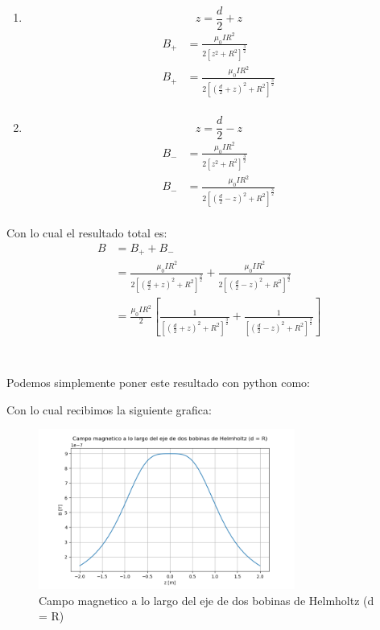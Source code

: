\documentclass{report}
\begin{document}
\begin{enumerate}
	\item $$z = \frac{d}{2} + z$$
		\begin{align*}
			B_+ &= \frac{\mu_0 I R^2}{2\left[ z^2 + R^2\right]^{\frac{3}{2}}}\\
			B_+ &= \frac{\mu_0 I R^2}{2\left[ \left(\frac{d}{2} + z\right)^2 + R^2\right]^{\frac{3}{2}}}\\
		\end{align*}
	\item $$z = \frac{d}{2} - z$$
		\begin{align*}
			B_- &= \frac{\mu_0 I R^2}{2\left[ z^2 + R^2\right]^{\frac{3}{2}}}\\
			B_- &= \frac{\mu_0 I R^2}{2\left[ \left(\frac{d}{2} - z\right)^2 + R^2\right]^{\frac{3}{2}}}\\
		\end{align*}
\end{enumerate}

Con lo cual el resultado total es:
\begin{align*}
	B &= B_+ + B_-\\
	& = \frac{\mu_0 I R^2}{2\left[ \left(\frac{d}{2} + z\right)^2 + R^2\right]^{\frac{3}{2}}} + \frac{\mu_0 I R^2}{2\left[ \left(\frac{d}{2} - z\right)^2 + R^2\right]^{\frac{3}{2}}}\\
	& = \frac{\mu_0 I R^2}{2} \left[\frac{1}{\left[ \left(\frac{d}{2} + z\right)^2 + R^2\right]^{\frac{3}{2}}} + \frac{1}{\left[ \left(\frac{d}{2} - z\right)^2 + R^2\right]^{\frac{3}{2}}}\right]\\
\end{align*}

\section{}

Podemos simplemente poner este resultado con python como:


Con lo cual recibimos la siguiente grafica:

\begin{figure}[H]
	\begin{center}
		\includegraphics[width=0.75\textwidth]{img/punto_12_b.png}
	\end{center}
	\caption{Campo magnetico a lo largo del eje de dos bobinas de Helmholtz (d = R)}\label{fig:Punto_12_b}
\end{figure}
\end{document}
